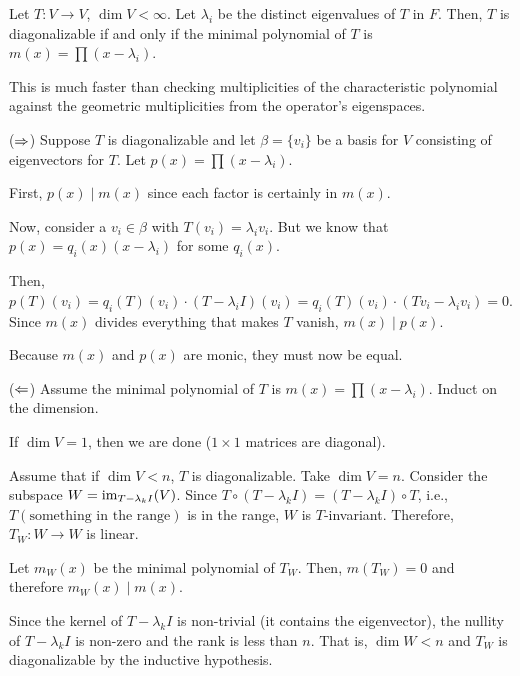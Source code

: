 \documentclass[notes,tikz]{agony}
\begin{document}
\begin{prop}
  Let $T : V \to V$, $\dim V < \infty$.
  Let $\lambda_i$ be the distinct eigenvalues of $T$ in $F$.
  Then, $T$ is diagonalizable if and only if the minimal polynomial of $T$
  is $m(x) = \prod (x-\lambda_i)$.
\end{prop}

This is much faster than checking multiplicities of the characteristic polynomial
against the geometric multiplicities from the operator's eigenspaces.

\begin{prf}
  ($\Rightarrow$) Suppose $T$ is diagonalizable and let $\beta = \{v_i\}$
  be a basis for $V$ consisting of eigenvectors for $T$.
  Let $p(x) = \prod (x-\lambda_i)$.

  First, $p(x) \mid m(x)$ since each factor is certainly in $m(x)$.

  Now, consider a $v_i \in \beta$ with $T(v_i) = \lambda_i v_i$.
  But we know that $p(x) = q_i(x)(x-\lambda_i)$ for some $q_i(x)$.

  Then, $p(T)(v_i) = q_i(T)(v_i)\cdot (T-\lambda_i I)(v_i) = q_i(T)(v_i)\cdot(Tv_i - \lambda_i v_i) = 0$.
  Since $m(x)$ divides everything that makes $T$ vanish,
  $m(x) \mid p(x)$.

  Because $m(x)$ and $p(x)$ are monic, they must now be equal.

  ($\Leftarrow$) Assume the minimal polynomial of $T$ is $m(x) = \prod (x-\lambda_i)$.
  Induct on the dimension.

  If $\dim V = 1$, then we are done ($1 \times 1$ matrices are diagonal).

  Assume that if $\dim V < n$, $T$ is diagonalizable.
  Take $\dim V = n$.
  Consider the subspace $W = \operatorname{im}_{T-\lambda_k I}(V)$.
  Since $T \circ (T-\lambda_k I) = (T-\lambda_k I)\circ T$,
  i.e., $T(\text{something in the range})$ is in the range,
  $W$ is $T$-invariant.
  Therefore, $T_W : W \to W$ is linear.

  Let $m_W(x)$ be the minimal polynomial of $T_W$.
  Then, $m(T_W) = 0$ and therefore $m_W(x) \mid m(x)$.

  Since the kernel of $T-\lambda_k I$ is non-trivial (it contains the eigenvector),
  the nullity of $T-\lambda_k I$ is non-zero and the rank is less than $n$.
  That is, $\dim W < n$ and $T_W$ is diagonalizable by the inductive hypothesis.
\end{prf}
\end{document}
